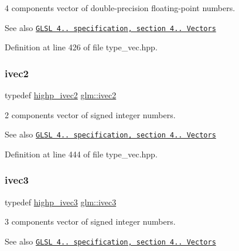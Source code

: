 4 components vector of double-\/precision floating-\/point numbers.

\begin{DoxySeeAlso}{See also}
\href{http://www.opengl.org/registry/doc/GLSLangSpec.4.20.8.pdf}{\tt G\+L\+SL 4.. specification, section 4.. Vectors} 
\end{DoxySeeAlso}


Definition at line 426 of file type\+\_\+vec.\+hpp.

\mbox{\label{group__core__types_ga9e6ce9cfc7919976b318197e18d8a065}} 
\subsubsection{\texorpdfstring{ivec2}{ivec2}}
{\footnotesize\ttfamily typedef \hyperlink{group__core__precision_gab2bac6095f51f7d7f74747afc2f6747a}{highp\+\_\+ivec2} \hyperlink{group__core__types_ga9e6ce9cfc7919976b318197e18d8a065}{glm\+::ivec2}}

2 components vector of signed integer numbers.

\begin{DoxySeeAlso}{See also}
\href{http://www.opengl.org/registry/doc/GLSLangSpec.4.20.8.pdf}{\tt G\+L\+SL 4.. specification, section 4.. Vectors} 
\end{DoxySeeAlso}


Definition at line 444 of file type\+\_\+vec.\+hpp.

\mbox{\label{group__core__types_ga6e12a4ca00d696f07da1df4eb73e0fe8}} 
\subsubsection{\texorpdfstring{ivec3}{ivec3}}
{\footnotesize\ttfamily typedef \hyperlink{group__core__precision_gae9f0a321de8ee92dce9d4400362d71e7}{highp\+\_\+ivec3} \hyperlink{group__core__types_ga6e12a4ca00d696f07da1df4eb73e0fe8}{glm\+::ivec3}}

3 components vector of signed integer numbers.

\begin{DoxySeeAlso}{See also}
\href{http://www.opengl.org/registry/doc/GLSLangSpec.4.20.8.pdf}{\tt G\+L\+SL 4.. specification, section 4.. Vectors} 
\end{DoxySeeAlso}


